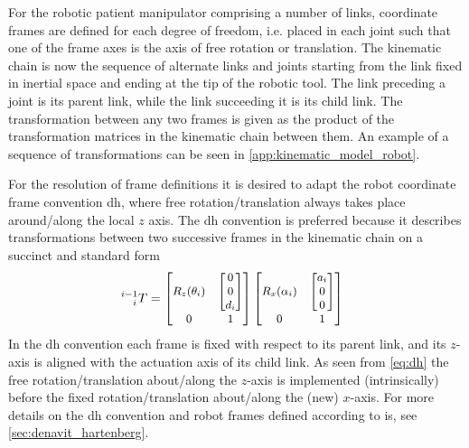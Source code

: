 For the robotic patient manipulator comprising a number of links, coordinate frames are defined for each degree of freedom, i.e. placed in each joint such that one of the frame axes is the axis of free rotation or translation. The kinematic chain is now the sequence of alternate links and joints starting from the link fixed in inertial space and ending at the tip of the robotic tool. The link preceding a joint is its parent link, while the link succeeding it is its child link. The transformation between any two frames is given as the product of the transformation matrices in the kinematic chain between them. An example of a sequence of transformations can be seen in \autoref{app:kinematic_model_robot}.

For the resolution of frame definitions it is desired to adapt the  robot coordinate frame convention \gls{dh}, where free rotation/translation always takes place around/along the local $z$ axis. The \gls{dh} convention is preferred because it describes transformations between two successive frames in the kinematic chain on a succinct and standard form 
\begin{equation}
\hspace*{-2mm}
\small
^{i-1}_{\phantom{-1}i} T =
\begin{bmatrix}
R_z(\theta_i) & \begin{bmatrix}0\\ 0\\ d_i\end{bmatrix}\\
0 & 1
\end{bmatrix}
\begin{bmatrix}
R_x(\alpha_i) & \begin{bmatrix}a_i\\ 0\\ 0\end{bmatrix}\\
0 & 1
\end{bmatrix}
\label{eq:dh}
\end{equation}
In the \gls{dh} convention each frame is fixed with respect to its parent link, and its $z$-axis is aligned with the actuation axis of its child link. As seen from \autoref{eq:dh} the free rotation/translation about/along the $z$-axis is implemented (intrinsically) before the fixed rotation/translation about/along the (new) $x$-axis. For more details on the \gls{dh} convention and robot frames defined according to is, see \autoref{sec:denavit_hartenberg}.


